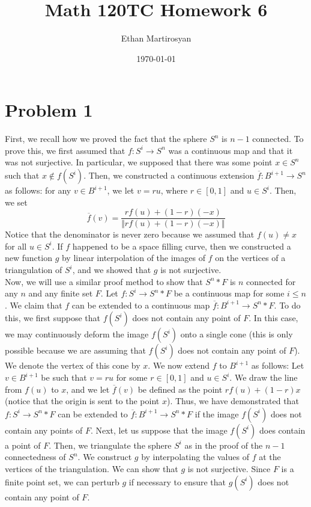 \documentclass[12pt]{article}
\begin{document}
 
\title{Math 120TC Homework 6}
\author{Ethan Martirosyan}
\date{\today}
\maketitle
{}
\hfuzz=50pt
\section*{Problem 1}
First, we recall how we proved the fact that the sphere $S^n$ is $n-1$ connected. To prove this, we first assumed that $f: S^i \rightarrow S^n$ was a continuous map and that it was not surjective. In particular, we supposed that there was some point $x \in S^n$ such that $x \not \in f(S^i)$. Then, we constructed a continuous extension $\overline{f}: B^{i+1} \rightarrow S^n$ as follows: for any $v \in B^{i+1}$, we let $v = ru$, where $r \in [0,1]$ and $u \in S^i$. Then, we set
\[
\overline{f}(v) = \frac{rf(u) + (1-r)(-x)}{\Vert rf(u) + (1-r)(-x)\Vert}
\] Notice that the denominator is never zero because we assumed that $f(u) \neq x$ for all $u \in S^i$. If $f$ happened to be a space filling curve, then we constructed a new function $g$ by linear interpolation of the images of $f$ on the vertices of a triangulation of $S^i$, and we showed that $g$ is not surjective.
\\
Now, we will use a similar proof method to show that $S^n * F$ is $n$ connected for any $n$ and any finite set $F$. Let $f: S^i \rightarrow S^n * F$ be a continuous map for some $i \leq n$. We claim that $f$ can be extended to a continuous map $\overline{f}: B^{i+1} \rightarrow S^n * F$. To do this, we first suppose that $f(S^i)$ does not contain any point of $F$. In this case, we may continuously deform the image $f(S^i)$ onto a single cone (this is only possible because we are assuming that $f(S^i)$ does not contain any point of $F$). We denote the vertex of this cone by $x$. We now extend $f$ to $B^{i+1}$ as follows: Let $v \in B^{i+1}$ be such that $v = ru$ for some $r \in [0,1]$ and $u \in S^i$. We draw the line from $f(u)$ to $x$, and we let $\overline{f}(v)$ be defined as the point $rf(u) + (1-r)x$ (notice that the origin is sent to the point $x$). Thus, we have demonstrated that $f: S^i \rightarrow S^{n} * F$ can be extended to $\overline{f} : B^{i+1} \rightarrow S^{n} * F$ if the image $f(S^i)$ does not contain any points of $F$. Next, let us suppose that the image $f(S^i)$ does contain a point of $F$. Then, we triangulate the sphere $S^i$ as in the proof of the $n-1$ connectedness of $S^n$. We construct $g$ by interpolating the values of $f$ at the vertices of the triangulation. We can show that $g$ is not surjective. Since $F$ is a finite point set, we can perturb $g$ if necessary to ensure that $g(S^i)$ does not contain any point of $F$.
\newpage
\end{document}
